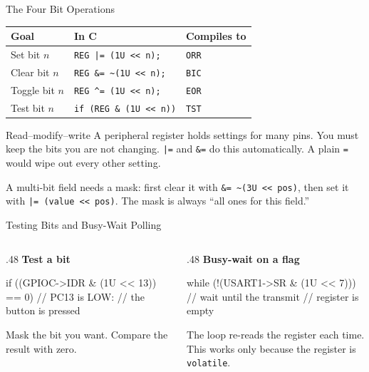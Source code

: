 \documentclass[9pt,aspectratio=169,xcolor=table]{beamer}
\newcommand{\shl}{\texttt{<{}<}}
\begin{document}
\begin{frame}{The Four Bit Operations}
    \begin{center}
    {\small
    \striped
    \begin{tabular}{@{}l l l@{}}
        \toprule
        \textbf{Goal} & \textbf{In C} & \textbf{Compiles to} \\
        \midrule
        Set bit $n$    & \texttt{REG |= (1U \shl\ n);}      & \texttt{ORR} \\
        Clear bit $n$  & \texttt{REG \&= \textasciitilde(1U \shl\ n);} & \texttt{BIC} \\
        Toggle bit $n$ & \texttt{REG \^{}= (1U \shl\ n);}   & \texttt{EOR} \\
        Test bit $n$   & \texttt{if (REG \& (1U \shl\ n))}  & \texttt{TST} \\
        \bottomrule
    \end{tabular}}
    \end{center}

    \vspace{3mm}
    \begin{block}{Read--modify--write}
        A peripheral register holds settings for \alert{many} pins.
        You must keep the bits you are not changing. \texttt{|=} and
        \texttt{\&=} do this automatically. A plain \texttt{=} would
        wipe out every other setting.
    \end{block}

    \vspace{2mm}
    {\small A multi-bit field needs a \alert{mask}: first clear it
    with \texttt{\&= \textasciitilde(3U \shl\ pos)}, then set it with
    \texttt{|= (value \shl\ pos)}. The mask is always ``all ones for this
    field.''}
\end{frame}

\begin{frame}[fragile]{Testing Bits and Busy-Wait Polling}
    \begin{columns}[T]
    \begin{column}{.48\textwidth}
        \textbf{Test a bit}
\begin{cc}[basicstyle=\ttfamily\footnotesize]
if ((GPIOC->IDR & (1U << 13)) == 0) {
    // PC13 is LOW:
    // the button is pressed
}
\end{cc}
        {\small Mask the bit you want. Compare the result with zero.}
    \end{column}
    \begin{column}{.48\textwidth}
        \textbf{Busy-wait on a flag}
\begin{cc}[basicstyle=\ttfamily\footnotesize]
while (!(USART1->SR & (1U << 7))) {
    // wait until the transmit
    // register is empty
}
\end{cc}
        {\small The loop re-reads the register each time. This works only because the register is \texttt{volatile}.}
    \end{column}
    \end{columns}
\end{frame}
\end{document}

